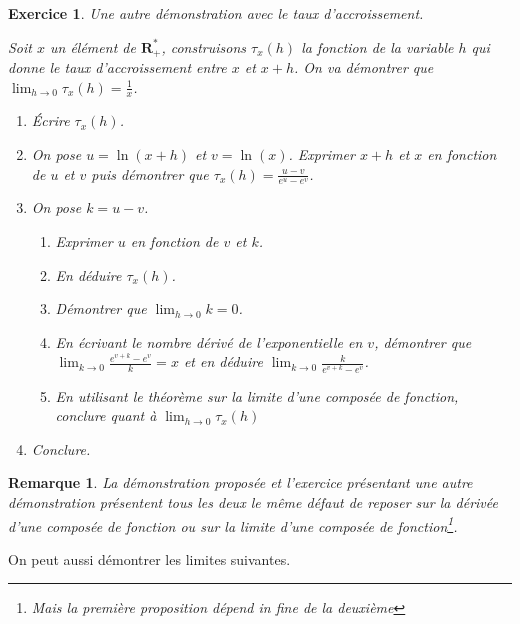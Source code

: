 \documentclass[11pt,a4paper,french]{article}
\newcommand{\R}{\mathbf{R}}
\theoremstyle{break}
\theoremstyle{plain}
\newtheorem{exerciceT}{Exercice}
\theoremstyle{nonumberplain}
\newtheorem{remarque}{Remarque}
\theoremstyle{nonumberbreak}
\newenvironment{exercice}{\begin{framed}\begin{exerciceT}}{\end{exerciceT}\end{framed}}
\begin{document}
\begin{exercice}
  Une autre démonstration avec le taux d'accroissement.

  Soit $x$ un élément de $\R_+^*$, construisons $\tau_x(h)$ la fonction
  de la variable $h$ qui donne le taux d'accroissement entre $x$ et $x +
  h$. On va démontrer que $\lim_{h\to 0} \tau_x(h) = \frac1x$.

  \begin{enumerate}
    \item Écrire $\tau_x(h)$.
    \item On pose $u = \ln(x+h)$ et $v = \ln(x)$. Exprimer $x+h$ et $x$
      en fonction de $u$ et $v$ puis démontrer que $\tau_x(h) = \frac{u
      -v}{e^u - e^v}$.
    \item On pose $k = u - v$.
      \begin{enumerate}
        \item Exprimer $u$ en fonction de $v$ et $k$.
        \item En déduire $\tau_x(h)$.
        \item Démontrer que $\lim_{h\to0}k = 0$.
        \item En écrivant le nombre dérivé de l'exponentielle en $v$,
          démontrer que $\lim_{k\to0}\frac{e^{v+k} - e^v}{k} = x$ et en
          déduire $\lim_{k\to0}\frac{k}{e^{v+k} - e^v}$.
        \item En utilisant le théorème sur la limite d'une composée de
          fonction, conclure quant à $\lim_{h\to 0}\tau_x(h)$
      \end{enumerate}
    \item Conclure.
  \end{enumerate}
\end{exercice}

\begin{remarque}
  La démonstration proposée et l'exercice présentant une autre
  démonstration présentent tous les deux le même défaut de reposer sur
  la dérivée d'une composée de fonction ou sur la limite d'une composée
  de fonction\footnote{Mais la première proposition dépend \textit{in
  fine} de la deuxième}.
\end{remarque}

On peut aussi démontrer les limites suivantes.
\end{document}

